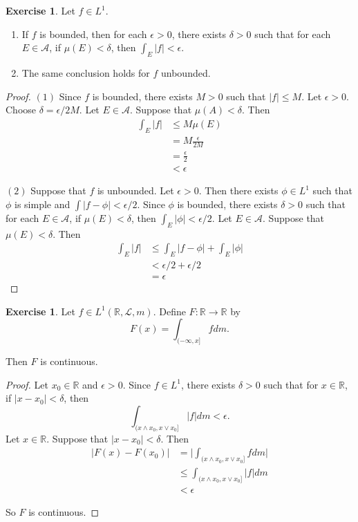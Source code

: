 \documentclass[12pt]{amsart}
\theoremstyle{definition}
\newtheorem{ex}[definition]{Exercise}
\newcommand{\del}{\delta}
\newcommand{\ep}{\epsilon}
\newcommand{\R}{\mathbb{R}}
\newcommand{\MA}{\mathcal{A}}
\newcommand{\ML}{\mathcal{L}}
\begin{document}
	\begin{ex}
		Let $f \in L^1$. 
		\begin{enumerate}
			\item If $f$ is bounded, then for each $\ep >0$, there exists $\del >0$ such that for each $E \in \MA$, if $\mu(E) < \del$, then $\int_E |f| < \ep $.
			\item The same conclusion holds for $f$ unbounded.
		\end{enumerate} 
	\end{ex}
	
	\begin{proof}
		$(1)$ Since $f$ is bounded, there exists $M >0$ such that $|f| \leq M$. Let $\ep >0$. Choose $\del = \ep/2M$. Let $E \in \MA$. Suppose that $\mu(A) < \del$. Then 
		\begin{align*}
			\int_E|f| 
			& \leq M \mu(E)\\
			&= M\frac{\ep}{2M}\\
			&= \frac{\ep}{2}\\
			&< \ep
		\end{align*}
		
		$(2)$ Suppose that $f$ is unbounded. Let $\epsilon >0$. Then there exists $\phi \in L^1$ such that $\phi$ is simple and $\int|f-\phi| < \ep/2$. Since $\phi$ is bounded, there exists $\del >0 $ such that for each $E \in \MA$, if $\mu(E) < \del$, then $\int_E |\phi| < \ep/2$. Let $E \in \MA$. Suppose that $\mu(E) < \del$. Then 
		\begin{align*}
			\int_E|f|
			& \leq \int_E |f-\phi| + \int_E |\phi|\\
			& < \ep/2 + \ep/2\\
			& = \ep
		\end{align*}   
	\end{proof}
	
	\begin{ex}
		Let $f \in L^1(\R, \ML, m)$. Define $F: \R \rightarrow \R$ by $$F(x) = \int_{(-\infty,x]}fdm.$$
		
		Then $F$ is continuous.
	\end{ex}
	
	\begin{proof}
		Let $x_0 \in \R$ and $\epsilon >0$. Since $f \in L^1$, there exists $\del >0$ such that for $x \in \R$, if $|x-x_0| < \del$, then $$\int_{(x \wedge x_0,x \vee x_0]}|f|dm < \ep.$$ Let $x \in \R$. Suppose that $|x-x_0|< \del$. Then 
		\begin{align*}
			|F(x)-F(x_0)|
			&= \bigg|\int_{(x \wedge x_0,x \vee x_0]}fdm\bigg|\\
			& \leq \int_{(x \wedge x_0,x \vee x_0]}|f|dm\\
			& < \ep
		\end{align*} 
		
		So $F$ is continuous.
		
	\end{proof}
	
\end{document}
